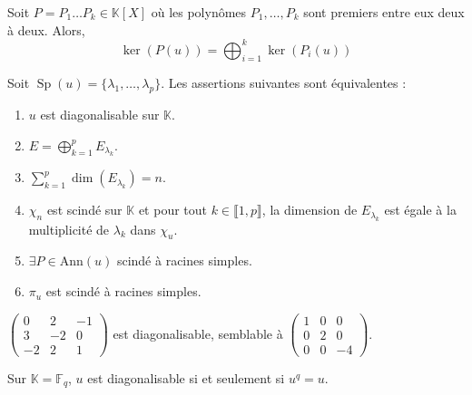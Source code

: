 
  \begin{theorem}
    Soit $P = P_1 \dots P_k \in \mathbb{K}[X]$ où les polynômes $P_1, \dots, P_k$ sont premiers entre eux deux à deux. Alors,
    \[ \ker(P(u)) = \bigoplus_{i=1}^k \ker(P_i(u)) \]
  \end{theorem}


  \begin{theorem}
    Soit $\operatorname{Sp}(u) = \{ \lambda_1, \dots, \lambda_p \}$. Les assertions suivantes sont équivalentes :
    \begin{enumerate}[label={\bfseries(\roman*)}]
      \item $u$ est diagonalisable sur $\mathbb{K}$.
      \item $E = \bigoplus_{k=1}^p E_{\lambda_k}$.
      \item $\sum_{k=1}^p \dim(E_{\lambda_k}) = n$.
      \item $\chi_n$ est scindé sur $\mathbb{K}$ et pour tout $k \in \llbracket 1, p \rrbracket$, la dimension de $E_{\lambda_k}$ est égale à la multiplicité de $\lambda_k$ dans $\chi_u$.
      \item $\exists P \in \mathrm{Ann}(u)$ scindé à racines simples.
      \item $\pi_u$ est scindé à racines simples.
    \end{enumerate}
  \end{theorem}


  \begin{example}
    $\begin{pmatrix} 0 & 2 & -1 \\ 3 & -2 & 0 \\ -2 & 2 & 1 \end{pmatrix}$ est diagonalisable, semblable à $\begin{pmatrix} 1 & 0 & 0 \\ 0 & 2 & 0 \\ 0 & 0 & -4 \end{pmatrix}$.
  \end{example}


  \begin{corollary}
    Sur $\mathbb{K} = \mathbb{F}_q$, $u$ est diagonalisable si et seulement si $u^q = u$.
  \end{corollary}


